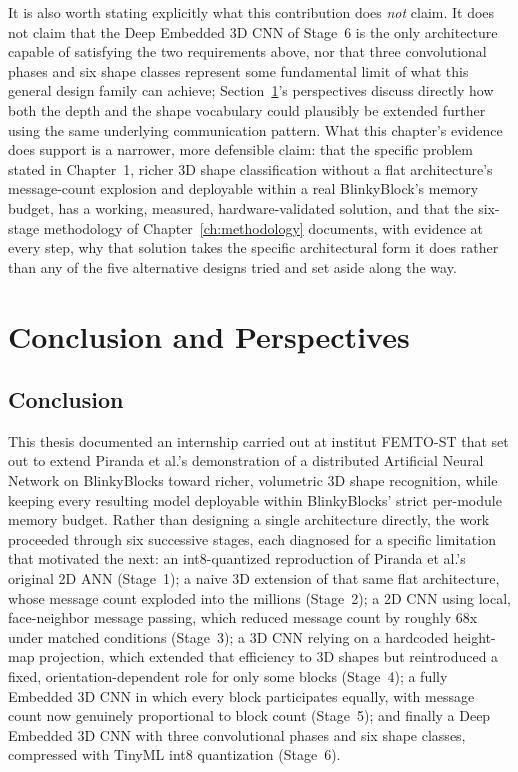 \documentclass[12pt,a4paper]{report}
\begin{document}
It is also worth stating explicitly what this contribution does \emph{not} claim. It does not claim that the Deep Embedded 3D CNN of Stage~6 is the only architecture capable of satisfying the two requirements above, nor that three convolutional phases and six shape classes represent some fundamental limit of what this general design family can achieve; Section~\ref{ch:conclusion}'s perspectives discuss directly how both the depth and the shape vocabulary could plausibly be extended further using the same underlying communication pattern. What this chapter's evidence does support is a narrower, more defensible claim: that the specific problem stated in Chapter~1, richer 3D shape classification without a flat architecture's message-count explosion and deployable within a real BlinkyBlock's memory budget, has a working, measured, hardware-validated solution, and that the six-stage methodology of Chapter~\ref{ch:methodology} documents, with evidence at every step, why that solution takes the specific architectural form it does rather than any of the five alternative designs tried and set aside along the way.

\chapter{Conclusion and Perspectives}
\label{ch:conclusion}

\section{Conclusion}

This thesis documented an internship carried out at institut FEMTO-ST that set out to extend Piranda et al.'s demonstration of a distributed Artificial Neural Network on BlinkyBlocks toward richer, volumetric 3D shape recognition, while keeping every resulting model deployable within BlinkyBlocks' strict per-module memory budget. Rather than designing a single architecture directly, the work proceeded through six successive stages, each diagnosed for a specific limitation that motivated the next: an int8-quantized reproduction of Piranda et al.'s original 2D ANN (Stage~1); a naive 3D extension of that same flat architecture, whose message count exploded into the millions (Stage~2); a 2D CNN using local, face-neighbor message passing, which reduced message count by roughly 68x under matched conditions (Stage~3); a 3D CNN relying on a hardcoded height-map projection, which extended that efficiency to 3D shapes but reintroduced a fixed, orientation-dependent role for only some blocks (Stage~4); a fully Embedded 3D CNN in which every block participates equally, with message count now genuinely proportional to block count (Stage~5); and finally a Deep Embedded 3D CNN with three convolutional phases and six shape classes, compressed with TinyML int8 quantization (Stage~6).
\end{document}
